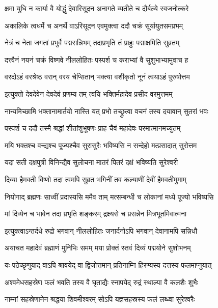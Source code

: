 \twolineshloka
{क्षमा युधि न कार्या वै योद्धुं देवारिसूदन}
{अनागते व्यतीते च दौर्बल्ये स्वजनोत्करे}%

\twolineshloka
{अकालिके त्वधर्मे च अनर्थे वाऽरिसूदन}
{एवमुक्त्वा ददौ चक्रं सूर्यायुतसमप्रभम्}%

\twolineshloka
{नेत्रं च नेता जगतां प्रभुर्वै पद्मसन्निभम्}
{तदाप्रभृति तं प्राहुः पद्माक्षमिति सुव्रतम्}%

\twolineshloka
{दत्त्वैनं नयनं चक्रं विष्णवे नीललोहितः}
{पस्पर्श च कराभ्यां वै सुशुभाभ्यामुवाच ह}%

\twolineshloka
{वरदोऽहं वरश्रेष्ठ वरान् वरय चेप्सितान्}
{भक्त्या वशीकृतो नूनं त्वयाऽहं पुरुषोत्तम}%

\twolineshloka
{इत्युक्तो देवदेवेन देवदेवं प्रणम्य तम्}
{त्वयि भक्तिर्महादेव प्रसीद वरमुत्तमम्}%

\twolineshloka
{नान्यमिच्छामि भक्तानामार्तयो नास्ति यत् प्रभो}
{तच्छ्रुत्वा वचनं तस्य दयावान् सुतरां भवः}%

\twolineshloka
{पस्पर्श च ददौ तस्मै श्रद्धां शीतांशुभूषणः}
{प्राह चैवं महादेवः परमात्मानमच्युतम्}%

\twolineshloka
{मयि भक्तश्च वन्द्यश्च पूज्यश्चैव सुरासुरैः}
{भविष्यसि न सन्देहो मत्प्रसादात् सुरोत्तम}%

\twolineshloka
{यदा सती दक्षपुत्री विनिन्द्यैव सुलोचना}
{मातरं पितरं दक्षं भविष्यति सुरेश्वरी}%

\twolineshloka
{दिव्या हैमवती विष्णो तदा त्वमपि सुव्रत}
{भगिनीं तव कल्याणीं देवीं हैमवतीमुमाम्}%

\twolineshloka
{नियोगाद् ब्रह्मणः साध्वीं प्रदास्यसि ममैव ताम्}
{मत्सम्बन्धी च लोकानां मध्ये पूज्यो भविष्यसि}%

\twolineshloka
{मां दिव्येन च भावेन तदा प्रभृति शङ्करम्}
{द्रक्ष्यसे च प्रसन्नेन मित्रभूतमिवात्मना}%

\twolineshloka
{इत्युक्त्वाऽन्तर्दधे रुद्रो भगवान् नीललोहितः}
{जनार्दनोऽपि भगवान् देवानामपि सन्निधौ}%

\twolineshloka
{अयाचत महादेवं ब्रह्माणं मुनिभिः समम्}
{मया प्रोक्तं स्तवं दिव्यं पद्मयोने सुशोभनम्}%

\twolineshloka
{यः पठेच्छृणुयाद् वाऽपि श्रावयेद् वा द्विजोत्तमान्}
{प्रतिनाम्नि हिरण्यस्य दत्तस्य फलमाप्नुयात्}%

\twolineshloka
{अश्वमेधसहस्रेण फलं भवति तस्य वै}
{घृताद्यैः स्नापयेद् रुद्रं स्थाल्या वै कलशैः शुभैः}%

\twolineshloka
{नाम्नां सहस्रेणानेन श्रद्धया शिवमीश्वरम्}
{सोऽपि यज्ञसहस्रस्य फलं लब्ध्वा सुरेश्वरैः}%

